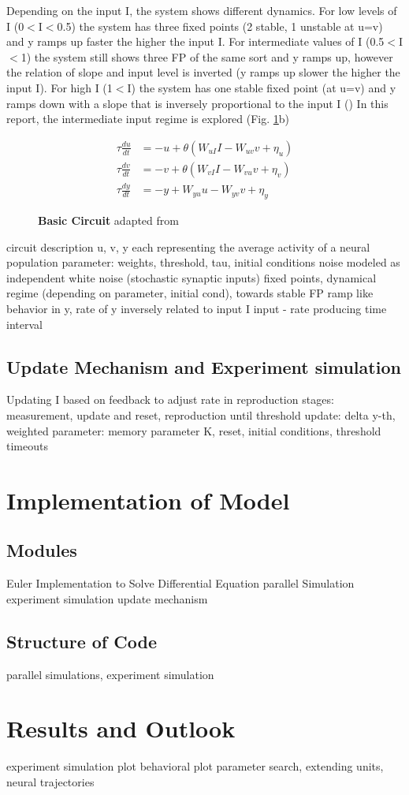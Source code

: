 \documentclass[9pt]{article}
\begin{document}
Depending on the input I, the system shows different dynamics. For low levels of I (0$<$I$<$0.5) the system has three fixed points (2 stable, 1 unstable at u=v) and y ramps up faster the higher the input I. 
For intermediate values of I (0.5$<$I$<$1) the system still shows three FP of the same sort and y ramps up, however the relation of slope and input level is inverted (y ramps up slower the higher the input I). 
For high I (1$<$I) the system has one stable fixed point (at u=v) and y ramps down with a slope that is inversely proportional to the input I ()
In this report, the intermediate input regime is explored (Fig. \ref{fig:circuit}b)

\begin{align} \label{circuit}
\tau\frac{du}{dt} & = -u + \theta(W_{uI}I - W_{uv}v + \eta_u) \\
\tau\frac{dv}{dt} & = -v + \theta(W_{vI}I - W_{vu}v + \eta_v) \\
\tau\frac{dy}{dt} & = -y + W_{yu}u - W_{yv}v + \eta_y
\end{align}

\begin{figure}[h]
	\centering
	\caption{\textbf{Basic Circuit} adapted from \cite{Egger2020}}
\label{fig:circuit}
\end{figure}


circuit description
u, v, y each representing the average activity of a neural population
parameter: weights, threshold, tau, initial conditions
noise modeled as independent white noise (stochastic synaptic inputs)
fixed points, dynamical regime (depending on parameter, initial cond), towards stable FP ramp like behavior in y, rate of y inversely related to input I 
input - rate
producing time interval 

\subsection{Update Mechanism and Experiment simulation}
Updating I based on feedback to adjust rate in reproduction
stages: measurement, update and reset, reproduction until threshold 
update: delta y-th, weighted
parameter: memory parameter K, reset, initial conditions, 
threshold 
timeouts


\section{Implementation of Model}
\subsection{Modules}
Euler Implementation to Solve Differential Equation
parallel Simulation
experiment simulation
update mechanism

\subsection{Structure of Code}
parallel simulations, experiment simulation

\section{Results and Outlook}
experiment simulation plot
behavioral plot
parameter search, extending units, neural trajectories
\end{document}
